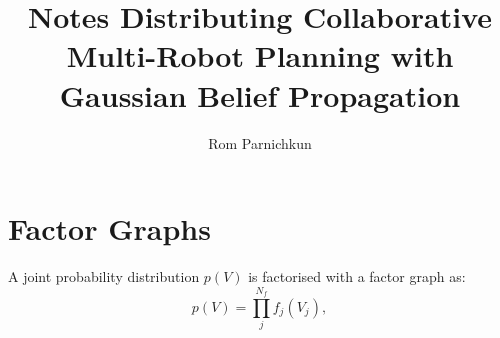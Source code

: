 \documentclass[twocolumn]{article}
\begin{document}
\title{Notes Distributing Collaborative Multi-Robot Planning with Gaussian Belief Propagation}
\author{Rom Parnichkun}

\maketitle

\section{Factor Graphs}

A joint probability distribution $p(V)$ is factorised with a factor graph as:
\begin{equation}
    p(V) = \prod_{j}^{N_f}{f_j(V_j)},
\end{equation}
\end{document}
